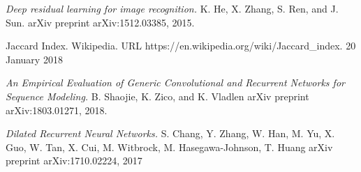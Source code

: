 \documentclass[a4paper, twoside]{article}
\begin{document}
\begin{thebibliography}{99}
	\textit{Deep residual learning for image recognition.}
    K. He, X. Zhang, S. Ren, and J. Sun. 
    arXiv preprint arXiv:1512.03385, 2015.

    
	Jaccard Index. Wikipedia.
    URL https://en.wikipedia.org/wiki/Jaccard{\_}index. 
    20 January 2018





	\textit{An Empirical Evaluation of Generic Convolutional and Recurrent Networks for Sequence Modeling.}
	B. Shaojie, K. Zico, and K. Vladlen
    arXiv preprint arXiv:1803.01271, 2018.
    
	\textit{Dilated Recurrent Neural Networks.}
	S. Chang, Y. Zhang, W. Han, M. Yu, X. Guo, W. Tan, X. Cui, M. Witbrock, M. Hasegawa-Johnson, T. Huang
	arXiv preprint arXiv:1710.02224, 2017


\end{thebibliography}
\end{document}
